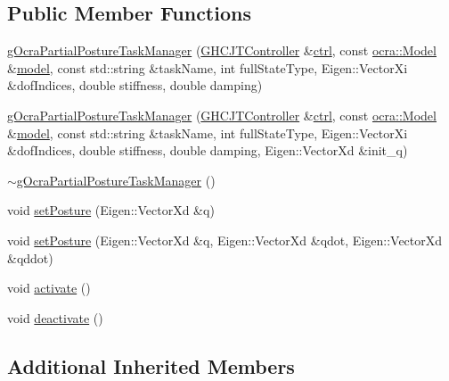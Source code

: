 \subsection*{Public Member Functions}
\begin{DoxyCompactItemize}
\item 
\hyperlink{classgocra_1_1gOcraPartialPostureTaskManager_afd597f38d4ee2dfb05606959bf90757f}{g\+Ocra\+Partial\+Posture\+Task\+Manager} (\hyperlink{classgocra_1_1GHCJTController}{G\+H\+C\+J\+T\+Controller} \&\hyperlink{classgocra_1_1gOcraTaskManagerBase_a52d76d9b54d92f3d31faeaafda99e4c7}{ctrl}, const \hyperlink{classocra_1_1Model}{ocra\+::\+Model} \&\hyperlink{classgocra_1_1gOcraTaskManagerBase_adc439e7170f7120611fc6d009d06404e}{model}, const std\+::string \&task\+Name, int full\+State\+Type, Eigen\+::\+Vector\+Xi \&dof\+Indices, double stiffness, double damping)
\item 
\hyperlink{classgocra_1_1gOcraPartialPostureTaskManager_a2dd620f693ca7ad7492e298a6a081b7d}{g\+Ocra\+Partial\+Posture\+Task\+Manager} (\hyperlink{classgocra_1_1GHCJTController}{G\+H\+C\+J\+T\+Controller} \&\hyperlink{classgocra_1_1gOcraTaskManagerBase_a52d76d9b54d92f3d31faeaafda99e4c7}{ctrl}, const \hyperlink{classocra_1_1Model}{ocra\+::\+Model} \&\hyperlink{classgocra_1_1gOcraTaskManagerBase_adc439e7170f7120611fc6d009d06404e}{model}, const std\+::string \&task\+Name, int full\+State\+Type, Eigen\+::\+Vector\+Xi \&dof\+Indices, double stiffness, double damping, Eigen\+::\+Vector\+Xd \&init\+\_\+q)
\item 
\hyperlink{classgocra_1_1gOcraPartialPostureTaskManager_af34bf754f071b3212c850c3b11b3a6b2}{$\sim$g\+Ocra\+Partial\+Posture\+Task\+Manager} ()
\item 
void \hyperlink{classgocra_1_1gOcraPartialPostureTaskManager_ac2fc6522b441a12831abd768ee8b591e}{set\+Posture} (Eigen\+::\+Vector\+Xd \&q)
\item 
void \hyperlink{classgocra_1_1gOcraPartialPostureTaskManager_a98a6312d1705dbc7ae682bf7fb98a28c}{set\+Posture} (Eigen\+::\+Vector\+Xd \&q, Eigen\+::\+Vector\+Xd \&qdot, Eigen\+::\+Vector\+Xd \&qddot)
\item 
void \hyperlink{classgocra_1_1gOcraPartialPostureTaskManager_ad33a136127d9cdb480748954dc0fd038}{activate} ()
\item 
void \hyperlink{classgocra_1_1gOcraPartialPostureTaskManager_a393b7f72db340b4d2bed172fd3f3ae1d}{deactivate} ()
\end{DoxyCompactItemize}
\subsection*{Additional Inherited Members}


